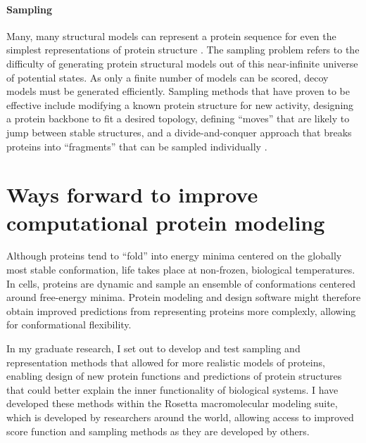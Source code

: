 \paragraph{Sampling}
Many, many structural models can represent a protein sequence for even the simplest representations of protein structure \cite{levinthal_how_1969,karplus_levinthal_1997}.
The sampling problem refers to the difficulty of generating protein structural models out of this near-infinite universe of potential states.
As only a finite number of models can be scored, decoy models must be generated efficiently.
Sampling methods that have proven to be effective include modifying a known protein structure for new activity\cite{jiang_novo_2008,siegel_computational_2010}, designing a protein backbone to fit a desired topology\cite{kuhlman_design_2003}, defining ``moves'' that are likely to jump between stable structures\cite{davis_backrub_2006,mandell_sub-angstrom_2009,friedland_simple_2008}, and a divide-and-conquer approach that breaks proteins into ``fragments'' that can be sampled individually \cite{simons_assembly_1997}.

\section{Ways forward to improve computational protein modeling}
Although proteins tend to ``fold'' into energy minima centered on the globally most stable conformation\cite{dill_levinthal_1997}, life takes place at non-frozen, biological temperatures.
In cells, proteins are dynamic and sample an ensemble of conformations centered around free-energy minima\cite{henzler-wildman_dynamic_2007}.
Protein modeling and design software might therefore obtain improved predictions from representing proteins more complexly, allowing for conformational flexibility.

In my graduate research, I set out to develop and test sampling and representation methods that allowed for more realistic models of proteins, enabling design of new protein functions and predictions of protein structures that could better explain the inner functionality of biological systems.
I have developed these methods within the Rosetta macromolecular modeling suite, which is developed by researchers around the world, allowing access to improved score function and sampling methods as they are developed by others.

